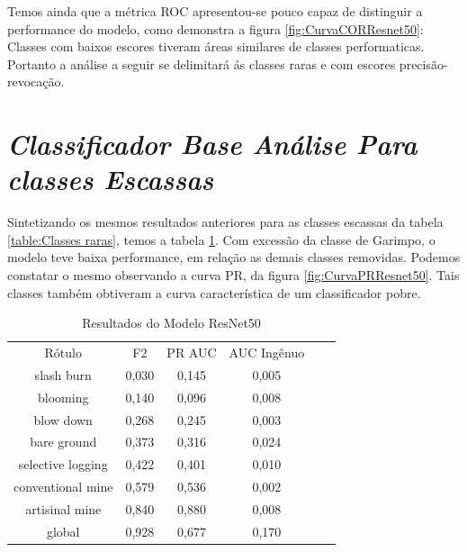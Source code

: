 Temos ainda que a métrica ROC apresentou-se pouco capaz de distinguir a performance do modelo, como demonstra a figura \ref{fig:CurvaCORResnet50}: Classes com baixos escores tiveram áreas similares de classes performaticas. Portanto a análise a seguir se delimitará ás classes raras e com escores precisão-revocação.

\section{\textit{Classificador Base Análise Para classes Escassas}}\label{sec:Cap4_ClassifiadorBase}

Sintetizando os mesmos resultados anteriores para as classes escassas da tabela \ref{table:Classes raras}, temos a tabela \ref{table:ResultadosResnet50ClassesRaras}. Com excessão da classe de Garimpo, o modelo teve baixa performance, em relação as demais classes removidas. Podemos constatar o mesmo observando a curva PR, da figura \ref{fig:CurvaPRResnet50}. Tais classes também obtiveram a curva característica de um classificador pobre. 



\begin{table}[h!]
    \caption{Resultados do Modelo ResNet50}
    \centering
\begin{tabular}{*{6}{c}}
    \toprule
    \midrule
                 Rótulo &  F2    & PR AUC &  AUC Ingênuo \\
             slash burn &  0,030 &  0,145 &       0,005 \\
               blooming &  0,140 &  0,096 &       0,008 \\
              blow down &  0,268 &  0,245 &       0,003 \\
            bare ground &  0,373 &  0,316 &       0,024 \\
      selective logging &  0,422 &  0,401 &       0,010 \\
      conventional mine &  0,579 &  0,536 &       0,002 \\
         artisinal mine &  0,840 &  0,880 &       0,008 \\
                 global &  0,928 &  0,677 &       0,170 \\         
    \bottomrule
\end{tabular}
\label{table:ResultadosResnet50ClassesRaras}
\end{table}
  

